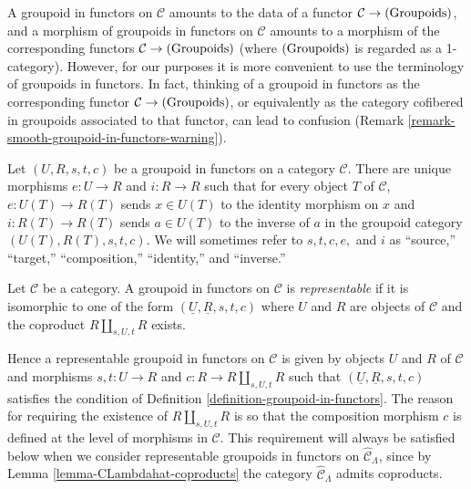 \begin{remark}
\label{remark-confusion-groupoids-in-functors}
A groupoid in functors on $\mathcal C$ amounts to the data of a functor $ 
\mathcal C \rightarrow \textnormal{(Groupoids)}$, and a morphism of groupoids 
in functors on $\mathcal C$ amounts to a morphism of the corresponding functors 
$\mathcal C \rightarrow \textnormal{(Groupoids)}$ (where 
$\textnormal{(Groupoids)}$ is regarded as a 1-category).  However, for our 
purposes it is more convenient to use the terminology of groupoids in functors. 
 In fact, thinking of a groupoid in functors as the corresponding functor 
$\mathcal C \rightarrow \textnormal{(Groupoids)}$, or equivalently as the 
category cofibered in groupoids associated to that functor, can lead to 
confusion (Remark \ref{remark-smooth-groupoid-in-functors-warning}).
\end{remark}

\begin{remark}
\label{remark-identity-inverse}
Let $(U,R,s,t,c)$ be a groupoid in functors on a category $\mathcal C$. There 
are unique morphisms $e: U \rightarrow R$ and $i: R \rightarrow R$ such that 
for every object $T$ of $\mathcal C$, $e: U(T) \rightarrow R(T)$ sends $x \in 
U(T)$ to the identity morphism on $x$ and $i: R(T) \rightarrow R(T)$ sends $a 
\in U(T)$ to the inverse of $a$ in the groupoid category $(U(T),R(T),s,t,c)$. 
We will sometimes refer to $s,t,c,e,$ and $i$ as ``source,'' ``target,'' 
``composition,'' ``identity,'' and ``inverse.''
\end{remark}

\begin{definition}
\label{definition-representable}
Let $\mathcal C$ be a category.  A groupoid in functors on $\mathcal C$ is 
{\it representable} if it is isomorphic to one of the form $(\underline{U}, 
\underline{R}, s,t,c)$ where $U$ and $R$ are objects of $\mathcal C$ and the 
coproduct $R \coprod_{s,U,t} R$ exists.
\end{definition}

\begin{remark}
\label{remark-reason-existence-coproduct}
Hence a representable groupoid in functors on $\mathcal C$ is given by objects 
$U$ and $R$ of $\mathcal C$ and morphisms $s,t: U \rightarrow R$ and $c: R 
\rightarrow R \coprod_{s,U,t} R$ such that 
$(\underline{U},\underline{R},s,t,c)$ satisfies the condition of Definition 
\ref{definition-groupoid-in-functors}. The reason for requiring the existence 
of $R \coprod_{s,U,t} R$ is so that the composition morphism $c$ is defined at 
the level of morphisms in $\mathcal C$.  This requirement will always be 
satisfied below when we consider representable groupoids in functors on 
$\widehat{\mathcal C}_{\Lambda}$, since by Lemma 
\ref{lemma-CLambdahat-coproducts} the category $\widehat{\mathcal C}_{\Lambda}$ 
admits coproducts.
\end{remark}

